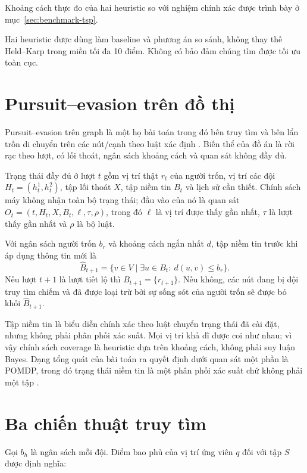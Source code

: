 Khoảng cách thực đo của hai heuristic so với nghiệm chính xác được trình bày ở
mục~\ref{sec:benchmark-tsp}.

Hai heuristic được dùng làm baseline và phương án so sánh, không thay thế
Held--Karp trong miền tối đa 10 điểm. Không có bảo đảm chúng tìm được tối ưu toàn
cục.

\section{Pursuit--evasion trên đồ thị}

Pursuit--evasion trên graph là một họ bài toán trong đó bên truy tìm và bên lẩn
trốn di chuyển trên các nút/cạnh theo luật xác định \cite{parsons1978,chung2011}. Biến thể
của đồ án là rời rạc theo lượt, có lối thoát, ngân sách khoảng cách và quan sát
không đầy đủ.

Trạng thái đầy đủ ở lượt $t$ gồm vị trí thật $r_t$ của người trốn, vị trí các đội
$H_t=(h_t^1,h_t^2)$, tập lối thoát $X$, tập niềm tin $B_t$ và lịch sử cần thiết.
Chính sách máy không nhận toàn bộ trạng thái; đầu vào của nó là quan sát
$O_t=(t,H_t,X,B_t,\ell,\tau,\rho)$, trong đó $\ell$ là vị trí được thấy gần nhất,
$\tau$ là lượt thấy gần nhất và $\rho$ là bộ luật.

\begin{formulabox}[title={Lan truyền tập niềm tin}]
Với ngân sách người trốn $b_r$ và khoảng cách ngắn nhất $d$, tập niềm tin trước
khi áp dụng thông tin mới là
\[
  \widehat{B}_{t+1}=\{v\in V\mid \exists u\in B_t:\ d(u,v)\le b_r\}.
\]
Nếu lượt $t+1$ là lượt tiết lộ thì $B_{t+1}=\{r_{t+1}\}$. Nếu không, các nút
đang bị đội truy tìm chiếm và đã được loại trừ bởi sự sống sót của người trốn sẽ
được bỏ khỏi $\widehat{B}_{t+1}$.
\end{formulabox}

Tập niềm tin là biểu diễn chính xác theo luật chuyển trạng thái đã cài đặt, nhưng
không phải phân phối xác suất. Mọi vị trí khả dĩ được coi như nhau; vì vậy chính
sách coverage là heuristic dựa trên khoảng cách, không phải suy luận Bayes. Dạng tổng quát của bài toán ra quyết định dưới quan sát
một phần là POMDP, trong đó trạng thái niềm tin là một phân phối xác suất chứ
không phải một tập \cite{kaelbling1998}.

\section{Ba chiến thuật truy tìm}

Gọi $b_h$ là ngân sách mỗi đội. Điểm bao phủ của vị trí ứng viên $q$ đối với tập
$S$ được định nghĩa:

